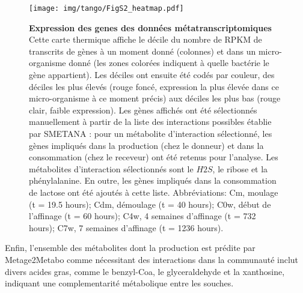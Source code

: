 \begin{figure}[H]
    \centering
    \texttt{[image: img/tango/FigS2\_heatmap.pdf]}
    \caption{\textbf{Expression des genes des données métatranscriptomiques} Cette carte thermique affiche le décile du nombre de RPKM de transcrits de gènes à un moment donné (colonnes) et dans un micro-organisme donné (les zones colorées indiquent à quelle bactérie le gène appartient). Les déciles ont ensuite été codés par couleur, des déciles les plus élevés (rouge foncé, expression la plus élevée dans ce micro-organisme à ce moment précis) aux déciles les plus bas (rouge clair, faible expression). Les gènes affichés ont été sélectionnés manuellement à partir de la liste des interactions possibles établie par SMETANA : pour un métabolite d'interaction sélectionné, les gènes impliqués dans la production (chez le donneur) et dans la consommation (chez le receveur) ont été retenus pour l'analyse. Les métabolites d'interaction sélectionnés sont le $H2S$, le ribose et la phénylalanine. En outre, les gènes impliqués dans la consommation de lactose ont été ajoutés à cette liste. Abbréviations: Cm, moulage (t = 19.5 hours); Cdm, démoulage (t = 40 hours); C0w, début de l'affinage (t = 60 hours); C4w, 4 semaines d'affinage (t = 732 hours); C7w, 7 semaines d'affinage (t = 1236 hours). }
    \label{fig:heatmap_metaT}
\end{figure}

Enfin, l'ensemble des métabolites dont la production est prédite par Metage2Metabo comme nécessitant des interactions dans la communauté inclut divers acides gras, comme le benzyl-Coa, le glyceraldehyde et la xanthosine, indiquant une complementarité métabolique entre les souches.




